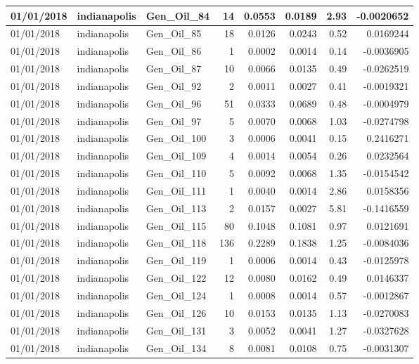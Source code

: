 \documentclass[
  letterpaper,
  DIV=11,
  numbers=noendperiod]{scrartcl}
\begin{document}
\begin{tabular}{l|l|l|r|r|r|r|r}
\hline
01/01/2018 & indianapolis & Gen\_Oil\_84 & 14 & 0.0553 & 0.0189 & 2.93 & -0.0020652\\
\hline
01/01/2018 & indianapolis & Gen\_Oil\_85 & 18 & 0.0126 & 0.0243 & 0.52 & 0.0169244\\
\hline
01/01/2018 & indianapolis & Gen\_Oil\_86 & 1 & 0.0002 & 0.0014 & 0.14 & -0.0036905\\
\hline
01/01/2018 & indianapolis & Gen\_Oil\_87 & 10 & 0.0066 & 0.0135 & 0.49 & -0.0262519\\
\hline
01/01/2018 & indianapolis & Gen\_Oil\_92 & 2 & 0.0011 & 0.0027 & 0.41 & -0.0019321\\
\hline
01/01/2018 & indianapolis & Gen\_Oil\_96 & 51 & 0.0333 & 0.0689 & 0.48 & -0.0004979\\
\hline
01/01/2018 & indianapolis & Gen\_Oil\_97 & 5 & 0.0070 & 0.0068 & 1.03 & -0.0274798\\
\hline
01/01/2018 & indianapolis & Gen\_Oil\_100 & 3 & 0.0006 & 0.0041 & 0.15 & 0.2416271\\
\hline
01/01/2018 & indianapolis & Gen\_Oil\_109 & 4 & 0.0014 & 0.0054 & 0.26 & 0.0232564\\
\hline
01/01/2018 & indianapolis & Gen\_Oil\_110 & 5 & 0.0092 & 0.0068 & 1.35 & -0.0154542\\
\hline
01/01/2018 & indianapolis & Gen\_Oil\_111 & 1 & 0.0040 & 0.0014 & 2.86 & 0.0158356\\
\hline
01/01/2018 & indianapolis & Gen\_Oil\_113 & 2 & 0.0157 & 0.0027 & 5.81 & -0.1416559\\
\hline
01/01/2018 & indianapolis & Gen\_Oil\_115 & 80 & 0.1048 & 0.1081 & 0.97 & 0.0121691\\
\hline
01/01/2018 & indianapolis & Gen\_Oil\_118 & 136 & 0.2289 & 0.1838 & 1.25 & -0.0084036\\
\hline
01/01/2018 & indianapolis & Gen\_Oil\_119 & 1 & 0.0006 & 0.0014 & 0.43 & -0.0125978\\
\hline
01/01/2018 & indianapolis & Gen\_Oil\_122 & 12 & 0.0080 & 0.0162 & 0.49 & 0.0146337\\
\hline
01/01/2018 & indianapolis & Gen\_Oil\_124 & 1 & 0.0008 & 0.0014 & 0.57 & -0.0012867\\
\hline
01/01/2018 & indianapolis & Gen\_Oil\_126 & 10 & 0.0153 & 0.0135 & 1.13 & -0.0270083\\
\hline
01/01/2018 & indianapolis & Gen\_Oil\_131 & 3 & 0.0052 & 0.0041 & 1.27 & -0.0327628\\
\hline
01/01/2018 & indianapolis & Gen\_Oil\_134 & 8 & 0.0081 & 0.0108 & 0.75 & -0.0031307\\

\end{tabular}
\end{document}

